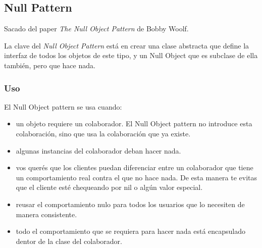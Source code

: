 \subsection{Null Pattern}

Sacado del paper \emph{The Null Object Pattern} de Bobby Woolf. 

La clave del \emph{Null Object Pattern} est\'a en crear una clase abstracta que define la interfaz de todos los objetos de este tipo, y un Null Object que es subclase de ella tambi\'en, pero que hace nada. 

\subsubsection*{Uso} 

El Null Object pattern se usa cuando: 

\begin{itemize}
 \item un objeto requiere un colaborador. El Null Object pattern no introduce esta colaboraci\'on, sino que usa la colaboraci\'on que ya existe. 
 \item algunas instancias del colaborador deban hacer nada. 
 \item vos quer\'es que los clientes puedan diferenciar entre un colaborador que tiene un comportamiento real contra el que no hace nada. De esta manera te evitas que el cliente est\'e chequeando por nil o alg\'un valor especial. 
 \item reusar el comportamiento nulo para todos los usuarios que lo necesiten de manera consistente.
 \item todo el comportamiento que se requiera para hacer nada est\'a encapsulado dentor de la clase del colaborador. 
\end{itemize}

